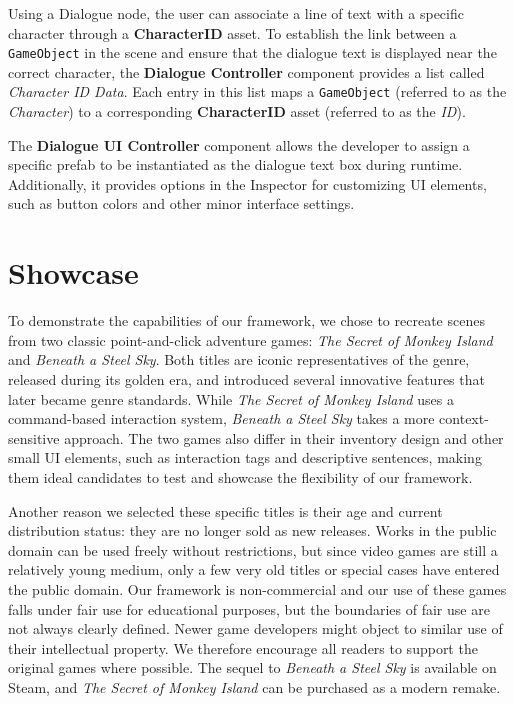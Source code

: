 Using a Dialogue node, the user can associate a line of text with a specific character through a \textbf{CharacterID} asset. To establish the link between a \verb|GameObject| in the scene and ensure that the dialogue text is displayed near the correct character, the \textbf{Dialogue Controller} component provides a list called \textit{Character ID Data}. Each entry in this list maps a \verb|GameObject| (referred to as the \textit{Character}) to a corresponding \textbf{CharacterID} asset (referred to as the \textit{ID}).

The \textbf{Dialogue UI Controller} component allows the developer to assign a specific prefab to be instantiated as the dialogue text box during runtime. Additionally, it provides options in the Inspector for customizing UI elements, such as button colors and other minor interface settings.

\section{Showcase}
To demonstrate the capabilities of our framework, we chose to recreate scenes from two classic point-and-click adventure games: \textit{The Secret of Monkey Island} and \textit{Beneath a Steel Sky}. Both titles are iconic representatives of the genre, released during its golden era, and introduced several innovative features that later became genre standards. While \textit{The Secret of Monkey Island} uses a command-based interaction system, \textit{Beneath a Steel Sky} takes a more context-sensitive approach. The two games also differ in their inventory design and other small UI elements, such as interaction tags and descriptive sentences, making them ideal candidates to test and showcase the flexibility of our framework.

Another reason we selected these specific titles is their age and current distribution status: they are no longer sold as new releases. Works in the public domain can be used freely without restrictions, but since video games are still a relatively young medium, only a few very old titles or special cases have entered the public domain.
Our framework is non-commercial and our use of these games falls under fair use for educational purposes, but the boundaries of fair use are not always clearly defined. 
Newer game developers might object to similar use of their intellectual property. We therefore encourage all readers to support the original games where possible. The sequel to \textit{Beneath a Steel Sky} is available on Steam, and \textit{The Secret of Monkey Island} can be purchased as a modern remake.

